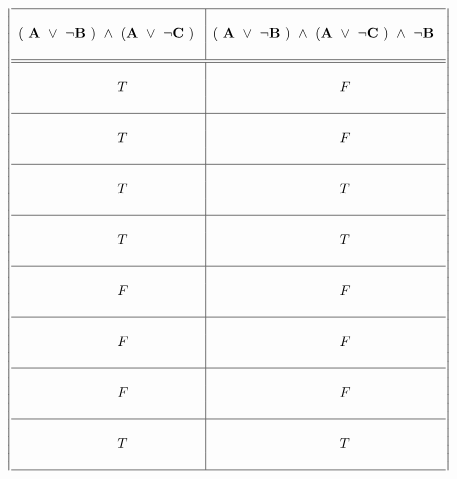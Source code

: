 \documentclass[10pt]{article}
\begin{document}
\\ \\ 
\[ 
\left | 
\begin{array}{l|l}
 \hline  & \\ \bf
( \ A \ \vee \ \neg B \ ) \ \wedge \ ( A \ 
\vee \ \neg C \ ) \ &  \bf ( \ A \ \vee \ \neg B \ ) \ \wedge \ ( A \ 
\vee \ \neg C \ ) \ \wedge \ \neg B \  \\
&  \\  
 \hline \hline &  \\
  \hspace{25mm} T & \hspace{32mm} F \\ 
  &  \\
  \hline &  \\ 
  \hspace{25mm} T & \hspace{32mm} F \\ 
  &  \\
  \hline &  \\ 
  \hspace{25mm} T & \hspace{32mm} T \\ 
  &  \\
  \hline &  \\ 
  \hspace{25mm} T & \hspace{32mm} T \\ 
  &  \\
  \hline &  \\ 
  \hspace{25mm} F & \hspace{32mm} F \\ 
  &  \\
  \hline &  \\ 
  \hspace{25mm} F & \hspace{32mm} F \\ 
  &  \\
  \hline &  \\ 
  \hspace{25mm} F & \hspace{32mm} F \\ 
  &  \\
  \hline &  \\
  \hspace{25mm} T & \hspace{32mm} T \\ 
  &  \\
  \hline
     \end{array} 
\right | \] 
\end{document}
